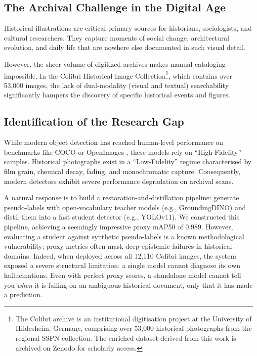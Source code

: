 \documentclass[12pt,onecolumn,a4paper]{IEEEtran}
\begin{document}
\subsection{The Archival Challenge in the Digital Age}
Historical illustrations are critical primary sources for historians, sociologists, 
and cultural researchers. They capture moments of social change, architectural 
evolution, and daily life that are nowhere else documented in such visual detail. 

However, the sheer volume of digitized archives makes manual cataloging impossible.
 In the Colibri Historical Image Collection\footnote{The Colibri archive is an institutional digitisation project at the University of Hildesheim, Germany, comprising over 53,000 historical photographs from the regional SSPN collection. The enriched dataset derived from this work is archived on Zenodo for scholarly access.}, which contains over 53,000 images, the lack of dual-modality (visual and textual) searchability significantly hampers the discovery of specific historical events and figures.
\subsection{Identification of the Research Gap}
While modern object detection has reached human-level performance on benchmarks like COCO \cite{coco2014} or OpenImages \cite{openimages2020}, these models rely on ``High-Fidelity'' samples. Historical photographs exist in a ``Low-Fidelity'' regime characterised by film grain, chemical decay, fading, and monochromatic capture. Consequently, modern detectors exhibit severe performance degradation on archival scans.

A natural response is to build a restoration-and-distillation pipeline: generate pseudo-labels with open-vocabulary teacher models (e.g., GroundingDINO) and distil them into a fast student detector (e.g., YOLOv11). We constructed this pipeline, achieving a seemingly impressive proxy mAP50 of 0.989. However, evaluating a student against synthetic pseudo-labels is a known methodological vulnerability; proxy metrics often mask deep epistemic failures in historical domains. Indeed, when deployed across all 12,110 Colibri images, the system exposed a severe structural limitation: a single model cannot diagnose its own hallucinations. Even with perfect proxy scores, a standalone model cannot tell you \textit{when} it is failing on an ambiguous historical document, only that it has made a prediction.
\end{document}
